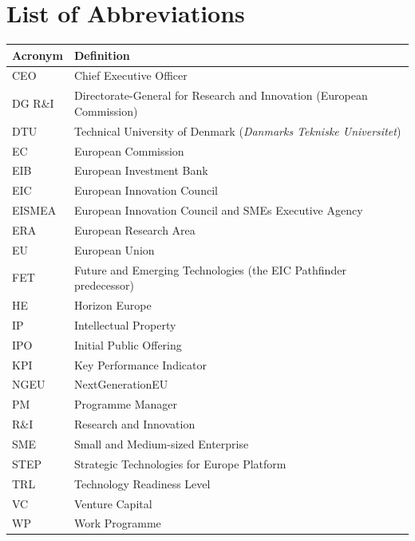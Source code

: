 \section*{List of Abbreviations}

\begin{tabularx}{\textwidth}{@{} l X @{}}
\toprule
\textbf{Acronym} & \textbf{Definition} \\
\midrule
CEO        & Chief Executive Officer \\
DG R\&I    & Directorate-General for Research and Innovation (European Commission) \\
DTU        & Technical University of Denmark (\textit{Danmarks Tekniske Universitet}) \\
EC         & European Commission \\
EIB        & European Investment Bank \\
EIC        & European Innovation Council \\
EISMEA     & European Innovation Council and SMEs Executive Agency \\
ERA        & European Research Area \\
EU         & European Union \\
FET        & Future and Emerging Technologies (the EIC Pathfinder predecessor) \\
HE         & Horizon Europe \\
IP         & Intellectual Property \\
IPO        & Initial Public Offering \\
KPI        & Key Performance Indicator \\
NGEU       & NextGenerationEU \\
PM         & Programme Manager \\
R\&I       & Research and Innovation \\
SME        & Small and Medium-sized Enterprise \\
STEP       & Strategic Technologies for Europe Platform \\
TRL        & Technology Readiness Level \\
VC         & Venture Capital \\
WP         & Work Programme \\
\bottomrule
\end{tabularx}
